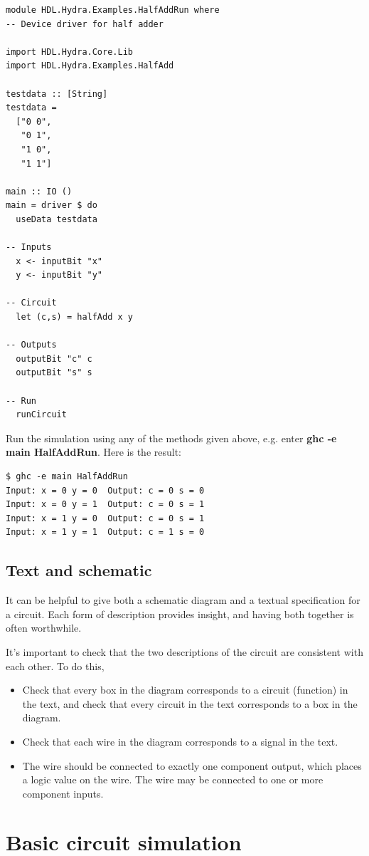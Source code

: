\documentclass[]{svmono}
\begin{document}
\begin{verbatim}
module HDL.Hydra.Examples.HalfAddRun where
-- Device driver for half adder

import HDL.Hydra.Core.Lib
import HDL.Hydra.Examples.HalfAdd

testdata :: [String]
testdata =
  ["0 0",
   "0 1",
   "1 0",
   "1 1"]

main :: IO ()
main = driver $ do
  useData testdata

-- Inputs
  x <- inputBit "x"
  y <- inputBit "y"

-- Circuit
  let (c,s) = halfAdd x y

-- Outputs
  outputBit "c" c
  outputBit "s" s

-- Run
  runCircuit
\end{verbatim}

Run the simulation using any of the methods given above, e.g. enter
\textbf{ghc -e main HalfAddRun}.  Here is the result:

\begin{verbatim}
$ ghc -e main HalfAddRun
Input: x = 0 y = 0  Output: c = 0 s = 0
Input: x = 0 y = 1  Output: c = 0 s = 1
Input: x = 1 y = 0  Output: c = 0 s = 1
Input: x = 1 y = 1  Output: c = 1 s = 0
\end{verbatim}
\subsection*{Text and schematic}
\label{sec:org43a21c3}

It can be helpful to give both a schematic diagram and a textual
specification for a circuit.  Each form of description provides
insight, and having both together is often worthwhile.

It's important to check that the two descriptions of the circuit are
consistent with each other.  To do this,
\begin{itemize}
\item Check that every box in the diagram corresponds to a circuit
(function) in the text, and check that every circuit in the text
corresponds to a box in the diagram.
\item Check that each wire in the diagram corresponds to a signal in the
text.
\item The wire should be connected to exactly one component output, which
places a logic value on the wire.  The wire may be connected to one
or more component inputs.
\end{itemize}
\section*{Basic circuit simulation}
\label{sec:org898d6b5}
\end{document}
